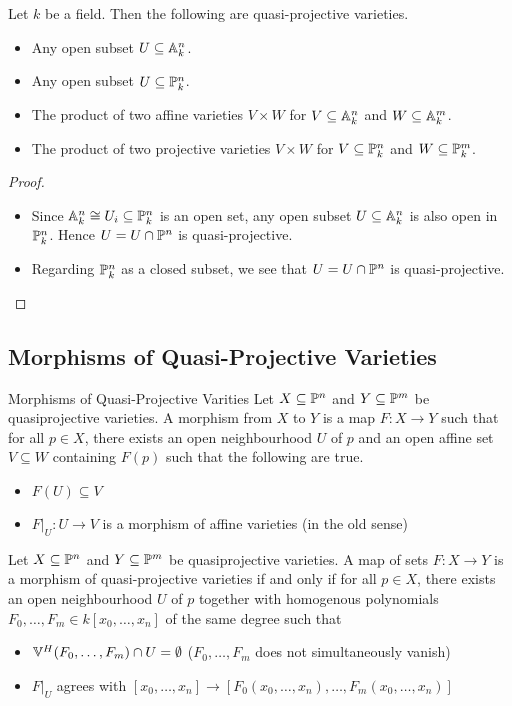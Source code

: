 \documentclass[a4paper]{article}
\begin{document}
\begin{prp}{}{} Let $k$ be a field. Then the following are quasi-projective varieties. 
\begin{itemize}
\item Any open subset $U\subseteq\mathbb{A}_k^n$. 
\item Any open subset $U\subseteq\mathbb{P}_k^n$. 
\item The product of two affine varieties $V\times W$ for $V\subseteq\mathbb{A}_k^n$ and $W\subseteq\mathbb{A}_k^m$. 
\item The product of two projective varieties $V\times W$ for $V\subseteq\mathbb{P}_k^n$ and $W\subseteq\mathbb{P}_k^m$. 
\end{itemize} \tcbline
\begin{proof}~\\
\begin{itemize}
\item Since $\mathbb{A}_k^n\cong U_i\subseteq\mathbb{P}_k^n$ is an open set, any open subset $U\subseteq\mathbb{A}_k^n$ is also open in $\mathbb{P}_k^n$. Hence $U=U\cap\mathbb{P}^n$ is quasi-projective. 
\item Regarding $\mathbb{P}_k^n$ as a closed subset, we see that $U=U\cap\mathbb{P}^n$ is quasi-projective. 
\end{itemize}
\end{proof}
\end{prp}

\subsection{Morphisms of Quasi-Projective Varieties}
\begin{defn}{Morphisms of Quasi-Projective Varities}{} Let $X\subseteq\mathbb{P}^n$ and $Y\subseteq\mathbb{P}^m$ be quasiprojective varieties. A morphism from $X$ to $Y$ is a map $F:X\to Y$ such that for all $p\in X$, there exists an open neighbourhood $U$ of $p$ and an open affine set $V\subseteq W$ containing $F(p)$ such that the following are true. 
\begin{itemize}
\item $F(U)\subseteq V$
\item $F|_U:U\to V$ is a morphism of affine varieties (in the old sense)
\end{itemize}
\end{defn}

\begin{prp}{}{} Let $X\subseteq\mathbb{P}^n$ and $Y\subseteq\mathbb{P}^m$ be quasiprojective varieties. A map of sets $F:X\to Y$ is a morphism of quasi-projective varieties if and only if for all $p\in X$, there exists an open neighbourhood $U$ of $p$ together with homogenous polynomials $F_0,\dots,F_m\in k[x_0,\dots,x_n]$ of the same degree such that 
\begin{itemize}
\item $\mathbb{V}^H(F_0,\dots,F_m)\cap U=\emptyset$ ($F_0,\dots,F_m$ does not simultaneously vanish)
\item $F|_U$ agrees with $[x_0,\dots,x_n]\to[F_0(x_0,\dots,x_n),\dots,F_m(x_0,\dots,x_n)]$
\end{itemize}
\end{prp}
\end{document}
